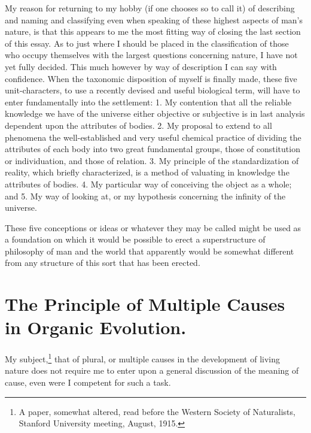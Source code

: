 \documentclass[a4paper, 11pt, oneside, polutonikogreek, english, landscape]{article}
\begin{document}
My reason for returning to my hobby (if one chooses so to call it) of describing and naming and classifying even when speaking of these highest aspects of man's nature, is that this appears to me the most fitting way of closing the last section of this essay. As to just where I should be placed in the classification of those who occupy themselves with the largest questions concerning nature, I have not yet fully decided. This much however by way of description I can say with confidence. When the taxonomic disposition of myself is finally made, these five unit-characters, to use a recently devised and useful biological term, will have to enter fundamentally into the settlement: 1. My contention that all the reliable knowledge we have of the universe either objective or subjective is in last analysis dependent upon the attributes of bodies. 2. My proposal to extend to all phenomena the well-established and very useful chemical practice of dividing the attributes of each body into two great fundamental groups, those of constitution or individuation, and those of relation. 3. My principle of the standardization of reality, which briefly characterized, is a method of valuating in knowledge the attributes of bodies. 4. My particular way of conceiving the object as a whole; and 5. My way of looking at, or my hypothesis concerning the infinity of the universe.

These five conceptions or ideas or whatever they may be called might be used as a foundation on which it would be possible to erect a superstructure of philosophy of man and the world that apparently would be somewhat different from any structure of this sort that has been erected.
\clearpage
\section{The Principle of Multiple Causes in Organic Evolution.}
\paragraph{}
My subject,\footnote{A paper, somewhat altered, read before the Western Society of Naturalists, Stanford University meeting, August, 1915.} that of plural, or multiple causes in the development of living nature does not require me to enter upon a general discussion of the meaning of cause, even were I competent for such a task.
\end{document}
